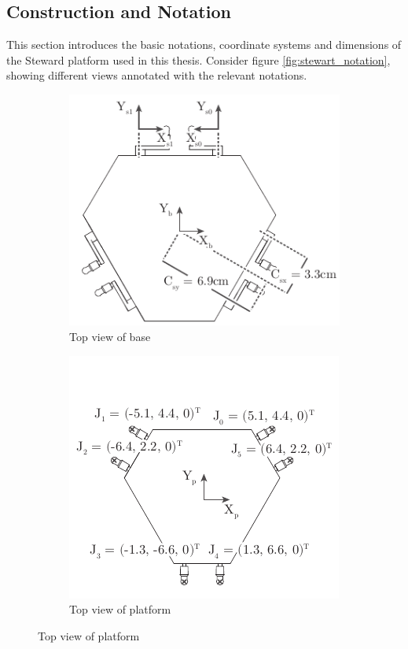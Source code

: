 \subsection{Construction and Notation}
This section introduces the basic notations, coordinate systems and dimensions
of the Steward platform used in this thesis. Consider figure
\ref{fig:stewart_notation}, showing different views annotated with the
relevant notations.
\begin{figure}
	\centering
	\begin{subfigure}{0.49\textwidth}
		\centering
		\includegraphics{../figures/stewart_base}
		\caption{Top view of base}
		\label{fig:stewart_base}
	\end{subfigure}
	\begin{subfigure}{0.49\textwidth}
		\centering
		\includegraphics{../figures/stewart_platform}
		\caption{Top view of platform}
		\label{fig:stewart_platform}
	\end{subfigure}
	\par\bigskip

\end{figure}
